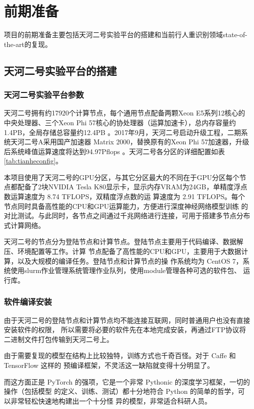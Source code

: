 \section{前期准备}
项目的前期准备主要包括天河二号实验平台的搭建和当前行人重识别领域state-of-the-art的复现。
\subsection{天河二号实验平台的搭建}

\subsubsection{天河二号实验平台参数}

天河二号拥有约17920个计算节点，每个通用节点配备两颗Xeon E5系列12核心的中央处理器、三个Xeon
Phi 57核心的协处理器（运算加速卡），总内存容量约1.4PB，全局存储总容量约12.4PB
\cite{tianhe2018config}。2017年9月，天河二号启动升级工程，二期系统天河二号A采用国产加速器
Matrix 2000，替换原有的Xeon Phi 57加速器，升级后系统峰值运算速度将达到94.97Pflops
\cite{tianhe2017summary}。天河二号各分区的详细配置如表\ref{tab:tianheconfig}。

本项目使用了天河二号的GPU分区，与其它分区最大的不同在于GPU分区每个节点都配备了2块NVIDIA
Tesla K80显示卡，显示内存VRAM为24GB，单精度浮点数运算速度为 8.74 TFLOPS，双精度浮点数的运
算速度为 2.91 TFLOPS。每个节点同时具备高性能的CPU和GPU运算能力，方便进行深度神经网络模型训练
的对比测试。与此同时，各节点之间通过千兆网络进行连接，可用于搭建多节点分布式计算网络。

天河二号的节点分为登陆节点和计算节点。登陆节点主要用于代码编译、数据解压、环境配置等工作。计算
节点配备了高性能的CPU和GPU，主要用于大数据计算，以及大规模的编译任务。登陆节点和计算节点的操
作系统均为 CentOS 7，系统使用slurm作业管理系统管理作业队列，使用module管理各种可选的软件包、
运行库。

\subsubsection{软件编译安装}

由于天河二号的登陆节点和计算节点均不能连接互联网，同时普通用户也没有直接安装软件的权限，
所以需要将必要的软件先在本地完成安装，再通过FTP协议将二进制文件打包传输到天河二号上。

由于需要复现的模型在结构上比较独特，训练方式也千奇百怪。对于 Caffe 和 TensorFlow 这样的
预编译框架，不灵活这一缺陷就变得十分明显了。

而这方面正是 PyTorch 的强项，它是一个非常 Pythonic 的深度学习框架，一切的操作（包括模型
的定义、训练、测试）都十分地符合 Python 的简单的哲学，可以非常轻松快速地构建出一个十分怪
异的模型，非常适合科研人员。

